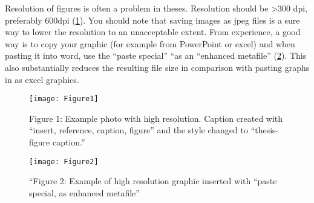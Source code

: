 Resolution of figures is often a problem in theses.  Resolution should be >300 dpi, preferably 600dpi (\ref{fig:figure1}).  You should note that saving images as jpeg files is a sure way to lower the resolution to an unacceptable extent.  From experience, a good way is to copy your graphic (for example from PowerPoint or excel) and when pasting it into word, use the “paste special” “as an “enhanced metafile” (\ref{fig:figure2}).  This also substantially reduces the resulting file size in comparison with pasting graphs in as excel graphics.

\begin{figure}
  \centering
  \texttt{[image: Figure1]}
  \caption{Figure 1: Example photo with high resolution.  Caption created with ``insert, reference, caption, figure'' and the style changed to ``thesis-figure caption.''}
  \label{fig:figure1}
\end{figure}

\begin{figure}
  \centering
  \texttt{[image: Figure2]}
  \caption{``Figure 2: Example of high resolution graphic inserted with “paste special, as enhanced metafile''}
  \label{fig:figure2}
\end{figure}
